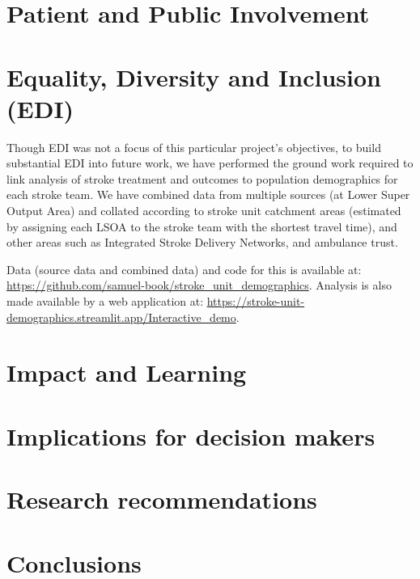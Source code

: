 
\section{Patient and Public Involvement}


\section{Equality, Diversity and Inclusion (EDI)}

Though EDI was not a focus of this particular project's objectives, to build substantial EDI into future work, we have performed the ground work required to link analysis of stroke treatment and outcomes to population demographics for each stroke team. We have combined data from multiple sources (at Lower Super Output Area) and collated according to stroke unit catchment areas (estimated by assigning each LSOA to the stroke team with the shortest travel time), and other areas such as Integrated Stroke Delivery Networks, and ambulance trust.

Data (source data and combined data) and code for this is available at: \url{https://github.com/samuel-book/stroke_unit_demographics}. Analysis is also made available by a web application at: \url{https://stroke-unit-demographics.streamlit.app/Interactive_demo}.

\section{Impact and Learning}

\section{Implications for decision makers}

\section{Research recommendations}

\section{Conclusions}


